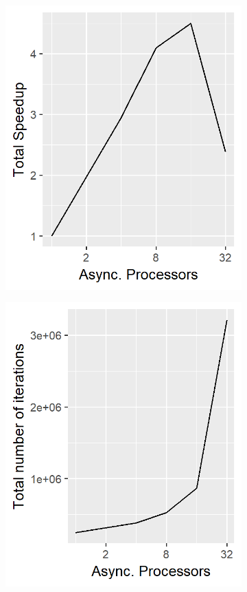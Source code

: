 \begin{figure}
	\centering
	\begin{subfigure}{0.30\linewidth}
		\includegraphics[width=1.0\linewidth]{./chapters/05.pcdm/scalability/speedup_pcdm_time.png}
	\end{subfigure}
	\begin{subfigure}{0.30\linewidth}
		\includegraphics[width=1.0\linewidth]{./chapters/05.pcdm/scalability/speedup_pcdm_iter.png}

\end{subfigure}
\end{figure}
